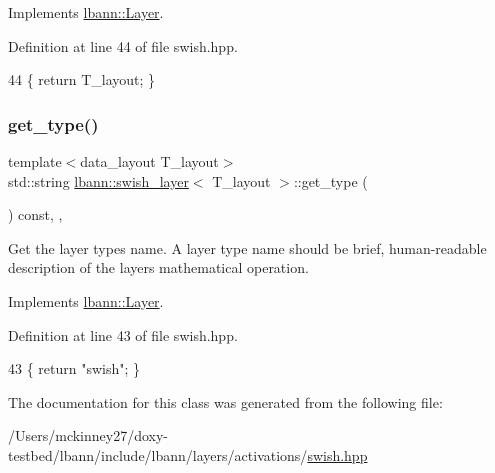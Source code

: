 Implements \hyperlink{classlbann_1_1Layer_a5dfb66e81fc085997402a5e2241316bd}{lbann\+::\+Layer}.



Definition at line 44 of file swish.\+hpp.


\begin{DoxyCode}
44 \{ \textcolor{keywordflow}{return} T\_layout; \}
\end{DoxyCode}
\mbox{\label{classlbann_1_1swish__layer_a136f8194f91a1148ab31bce29c08e3c8}} 
\subsubsection{\texorpdfstring{get\+\_\+type()}{get\_type()}}
{\footnotesize\ttfamily template$<$data\+\_\+layout T\+\_\+layout$>$ \\
std\+::string \hyperlink{classlbann_1_1swish__layer}{lbann\+::swish\+\_\+layer}$<$ T\+\_\+layout $>$\+::get\+\_\+type (\begin{DoxyParamCaption}{ }\end{DoxyParamCaption}) const\hspace{0.3cm}{\ttfamily [inline]}, {\ttfamily [override]}, {\ttfamily [virtual]}}

Get the layer type\textquotesingle{}s name. A layer type name should be brief, human-\/readable description of the layer\textquotesingle{}s mathematical operation. 

Implements \hyperlink{classlbann_1_1Layer_a0fa0ea9160b490c151c0a17fde4f7239}{lbann\+::\+Layer}.



Definition at line 43 of file swish.\+hpp.


\begin{DoxyCode}
43 \{ \textcolor{keywordflow}{return} \textcolor{stringliteral}{"swish"}; \}
\end{DoxyCode}


The documentation for this class was generated from the following file\+:\begin{DoxyCompactItemize}
\item 
/\+Users/mckinney27/doxy-\/testbed/lbann/include/lbann/layers/activations/\hyperlink{swish_8hpp}{swish.\+hpp}\end{DoxyCompactItemize}
